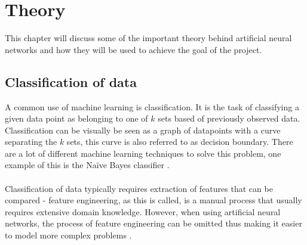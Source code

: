 \chapter{Theory}
This chapter will discuss some of the important theory behind artificial neural networks and how they will be used to achieve the goal of the project.

\section{Classification of data}
A common use of machine learning is classification. It is the task of classifying a given data point as belonging to one of $k$ sets based of previously observed data. Classification can be visually be seen as a graph of datapoints with a curve separating the $k$ sets, this curve is also referred to as decision boundary. There are a lot of different machine learning techniques to solve this problem, one example of this is the Naïve Bayes classifier \parencite{rish2001empirical}. 
\\\\
Classification of data typically requires extraction of features that can be compared - feature engineering, as this is called, is a manual process that usually requires extensive domain knowledge. However, when using artificial neural networks, the process of feature engineering can be omitted  thus making it easier to model more complex problems \parencite{ronan2011nlp}.

